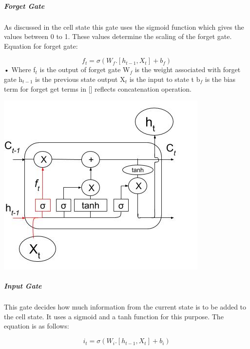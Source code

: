 \subparagraph{Forget Gate}

As discussed in the cell state this gate uses the sigmoid function which gives the values between 0 to 1. These values determine the scaling of the forget gate.
Equation for forget gate:

\begin{equation}
	f_{t} = \sigma (W_{f} . [h_{t-1}, X_{t}] + b_{f})	
\end{equation}•
Where f$_{t}$ is the output of forget gate
	W$_{f}$ is the weight associated with forget gate
	h$_{t-1}$ is the previous state output
	X$_{t}$ is the input to state t
	b$_{f}$ is the bias term for forget get
	terms in [] reflects concatenation operation.

				\begin{center}
				\includegraphics[width=\linewidth]{figures/Forget-gate.jpg}	
				\label{fig: Forget Gate}
				\end{center}

\subparagraph{Input Gate}

This gate decides how much information from the current state is to be added to the cell state. It uses a sigmoid and a tanh function for this purpose. The equation is as follows:

\begin{equation}
	i_{t} = \sigma (W_{i} . [h_{t-1}, X_{t}] + b_{i})
\end{equation}

